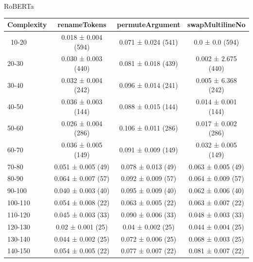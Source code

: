 \documentclass[sigconf,review,anonymous]{acmart}
\begin{document}
  RoBERTa
    {
    \begin{table}[H]
      \begin{tabular}{l|ccc}
        Complexity          & renameTokens        & permuteArgument     & swapMultilineNo     \\\hline\
        10-20               & 0.018 ± 0.004 (594) & 0.071 ± 0.024 (541) & 0.0 ± 0.0 (594)     \\
        20-30               & 0.030 ± 0.003 (440) & 0.081 ± 0.018 (439) & 0.002 ± 2.675 (440) \\
        30-40               & 0.032 ± 0.004 (242) & 0.096 ± 0.014 (241) & 0.005 ± 6.368 (242) \\
        40-50               & 0.036 ± 0.003 (144) & 0.088 ± 0.015 (144) & 0.014 ± 0.001 (144) \\
        50-60               & 0.026 ± 0.004 (286) & 0.106 ± 0.011 (286) & 0.017 ± 0.002 (286) \\
        60-70               & 0.036 ± 0.005 (149) & 0.091 ± 0.009 (149) & 0.032 ± 0.005 (149) \\
        70-80               & 0.051 ± 0.005 (49)  & 0.078 ± 0.013 (49)  & 0.063 ± 0.005 (49)  \\
        80-90               & 0.064 ± 0.007 (57)  & 0.092 ± 0.009 (57)  & 0.064 ± 0.009 (57)  \\
        90-100              & 0.040 ± 0.003 (40)  & 0.095 ± 0.009 (40)  & 0.062 ± 0.006 (40)  \\
        100-110             & 0.054 ± 0.008 (22)  & 0.063 ± 0.005 (22)  & 0.063 ± 0.007 (22)  \\
        110-120             & 0.045 ± 0.003 (33)  & 0.090 ± 0.006 (33)  & 0.048 ± 0.003 (33)  \\
        120-130             & 0.02 ± 0.001 (25)   & 0.04 ± 0.002 (25)   & 0.044 ± 0.004 (25)  \\
        130-140             & 0.044 ± 0.002 (25)  & 0.072 ± 0.006 (25)  & 0.068 ± 0.003 (25)  \\
        140-150             & 0.054 ± 0.005 (22)  & 0.077 ± 0.007 (22)  & 0.081 ± 0.007 (22)
      \end{tabular}
    \end{table}
  }
\end{document}
